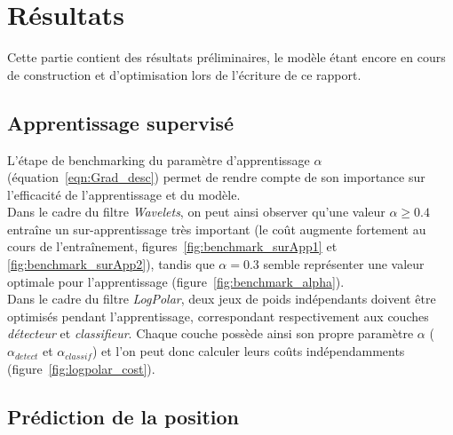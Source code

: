 
\chapter{Résultats} %
 
\label{Résultats} %


Cette partie contient des résultats préliminaires, le modèle étant encore en cours de construction et d'optimisation lors de l'écriture de ce rapport.

\section{Apprentissage supervisé}

L'étape de benchmarking du paramètre d'apprentissage $\alpha$ (équation~\ref{eqn:Grad_desc}) permet de rendre compte de son importance sur l'efficacité de l'apprentissage et du modèle. \\
Dans le cadre du filtre \textit{Wavelets}, on peut ainsi observer qu'une valeur $\alpha\geq0.4$ entraîne un sur-apprentissage très important (le coût augmente fortement au cours de l'entraînement, figures~\ref{fig:benchmark_surApp1} et \ref{fig:benchmark_surApp2}), tandis que $\alpha=0.3$ semble représenter une valeur optimale pour l'apprentissage (figure~\ref{fig:benchmark_alpha}).\\
Dans le cadre du filtre \textit{LogPolar}, deux jeux de poids indépendants doivent être optimisés pendant l'apprentissage,  correspondant respectivement aux couches \textit{détecteur} et \textit{classifieur}. Chaque couche possède ainsi son propre paramètre $\alpha$ ($\alpha_{detect}$ et $\alpha_{classif}$) et l'on peut donc calculer leurs coûts indépendamments (figure~\ref{fig:logpolar_cost}).


\section{Prédiction de la position}

